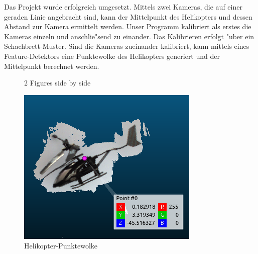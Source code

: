 Das Projekt wurde erfolgreich umgesetzt.
Mittels zwei Kameras, die auf einer geraden Linie angebracht sind, kann der Mittelpunkt des Helikopters und dessen Abstand zur Kamera ermittelt werden.\newline
Unser Programm kalibriert als erstes die Kameras einzeln und anschlie"send zu einander. Das Kalibrieren erfolgt "uber ein Schachbrett-Muster. Sind die Kameras zueinander kalibriert, kann mittels eines Feature-Detektors eine Punktewolke des Helikopters generiert und der Mittelpunkt berechnet werden.

\begin{figure}%
	\centering
	\qquad
	\caption{2 Figures side by side}%
	\label{fig:example}%
\end{figure}

\begin{figure}[H]
	\includegraphics[scale=0.5]{bilder/helicloud}
	\caption[Helikopter-Punktewolke]{Helikopter-Punktewolke}
\end{figure}

